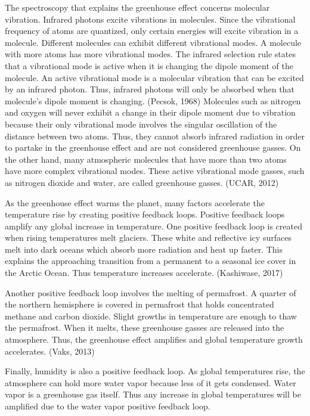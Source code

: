\documentclass[12pt,]{article}
\begin{document}
The spectroscopy that explains the greenhouse effect concerns molecular
vibration. Infrared photons excite vibrations in molecules. Since the
vibrational frequency of atoms are quantized, only certain energies will
excite vibration in a molecule. Different molecules can exhibit
different vibrational modes. A molecule with more atoms has more
vibrational modes. The infrared selection rule states that a vibrational
mode is active when it is changing the dipole moment of the molecule. An
active vibrational mode is a molecular vibration that can be excited by
an infrared photon. Thus, infrared photons will only be absorbed when
that molecule's dipole moment is changing. (Pecsok, 1968) Molecules such
as nitrogen and oxygen will never exhibit a change in their dipole
moment due to vibration because their only vibrational mode involves the
singular oscillation of the distance between two atoms. Thus, they
cannot absorb infrared radiation in order to partake in the greenhouse
effect and are not considered greenhouse gasses. On the other hand, many
atmospheric molecules that have more than two atoms have more complex
vibrational modes. These active vibrational mode gasses, such as
nitrogen dioxide and water, are called greenhouse gasses. (UCAR, 2012)

As the greenhouse effect warms the planet, many factors accelerate the
temperature rise by creating positive feedback loops. Positive feedback
loops amplify any global increase in temperature. One positive feedback
loop is created when rising temperatures melt glaciers. These white and
reflective icy surfaces melt into dark oceans which absorb more
radiation and heat up faster. This explains the approaching transition
from a permanent to a seasonal ice cover in the Arctic Ocean. Thus
temperature increases accelerate. (Kashiwase, 2017)

Another positive feedback loop involves the melting of permafrost. A
quarter of the northern hemisphere is covered in permafrost that holds
concentrated methane and carbon dioxide. Slight growths in temperature
are enough to thaw the permafrost. When it melts, these greenhouse
gasses are released into the atmosphere. Thus, the greenhouse effect
amplifies and global temperature growth accelerates. (Vaks, 2013)

Finally, humidity is also a positive feedback loop. As global
temperatures rise, the atmosphere can hold more water vapor because less
of it gets condensed. Water vapor is a greenhouse gas itself. Thus any
increase in global temperatures will be amplified due to the water vapor
positive feedback loop.
\end{document}
